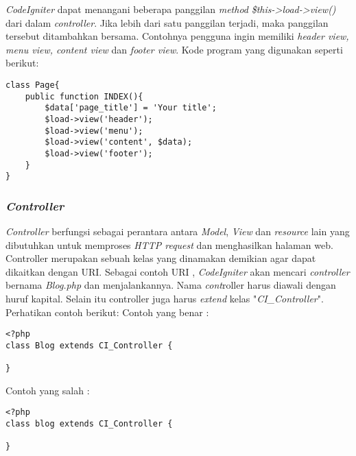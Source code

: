 	\textit{CodeIgniter} dapat menangani beberapa panggilan \textit{method} \textit{\$this->load->view()} dari dalam \textit{controller}. Jika lebih dari satu panggilan terjadi, maka panggilan tersebut ditambahkan bersama. Contohnya pengguna ingin memiliki \textit{header view, menu view, content view} dan \textit{footer view}. Kode program yang digunakan seperti berikut:
	\begin{lstlisting}[basicstyle=\ttfamily, frame=single,
columns=fullflexible, keepspaces=true, breaklines=true]
class Page{
	public function INDEX(){
		$data['page_title'] = 'Your title';
		$load->view('header');
		$load->view('menu');
		$load->view('content', $data);
		$load->view('footer');
	}
}
\end{lstlisting}
	
	\subsubsection{\textit{Controller}}
	\textit{Controller} berfungsi sebagai perantara antara \textit{Model}, \textit{View} dan \textit{resource} lain yang dibutuhkan untuk memproses \textit{HTTP request} dan menghasilkan halaman web. Controller merupakan sebuah kelas yang dinamakan demikian agar dapat dikaitkan dengan URI. Sebagai contoh URI , \textit{CodeIgniter} akan mencari \textit{controller} bernama \textit{Blog.php} dan menjalankannya. Nama \textit{cont}roller harus diawali dengan huruf kapital. Selain itu controller juga harus \textit{extend} kelas "\textit{CI\_Controller}".
	Perhatikan contoh berikut:
	Contoh yang benar :
\begin{lstlisting}[basicstyle=\ttfamily, frame=single,
columns=fullflexible, keepspaces=true, breaklines=true]
<?php
class Blog extends CI_Controller {

}
\end{lstlisting}
	
	Contoh yang salah :
\begin{lstlisting}[basicstyle=\ttfamily, frame=single,
columns=fullflexible, keepspaces=true, breaklines=true]
<?php
class blog extends CI_Controller {

}
\end{lstlisting} 

